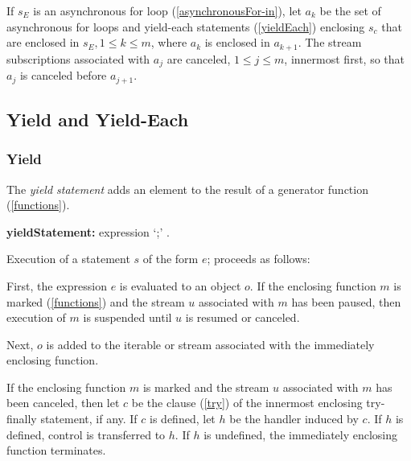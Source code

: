 \documentclass{article}
\newcommand{\code}[1]{{\sf #1}}
\begin{document}
 
\LMHash{}
 If $s_E$ is an asynchronous for loop (\ref{asynchronousFor-in}), let $a_k$ be the set of asynchronous for loops and yield-each statements (\ref{yieldEach}) enclosing $s_c$ that are enclosed in $s_E , 1 \le k \le m$, where $a_k$ is enclosed in $a_{k+1}$.   The stream subscriptions associated with $a_j$ are canceled, $1 \le j \le m$, innermost first, so that $a_j$ is canceled before $a_{j+1}$. 
 
 \subsection{ Yield and Yield-Each}
 
 \subsubsection{ Yield}
 
\LMHash{}
 The {\em yield statement} adds an element to the result of a generator function (\ref{functions}).

 \begin{grammar}
{\bf yieldStatement:}
   \YIELD{} expression `{\escapegrammar ;}'
      .
\end{grammar}

\LMHash{}
Execution of a statement $s$ of the form \code{\YIELD{} $e$;}  proceeds as follows:

\LMHash{}
First, the expression $e$ is evaluated to an object $o$. If the enclosing function $m$ is marked \ASYNC* (\ref{functions}) and the stream $u$ associated with $m$ has been paused,  then execution of $m$ is suspended until $u$ is resumed or canceled.

\LMHash{}
Next, $o$ is added to the iterable or stream associated with the immediately enclosing function. 

\LMHash{}
If the enclosing function $m$ is marked \ASYNC* and the stream $u$ associated with $m$ has been canceled, then let $c$ be the \FINALLY{} clause (\ref{try}) of the innermost enclosing try-finally statement, if any. If $c$ is defined, let $h$ be the handler induced by $c$. If $h$ is defined, control is transferred to $h$. If $h$ is undefined, the immediately enclosing function terminates.
\end{document}
